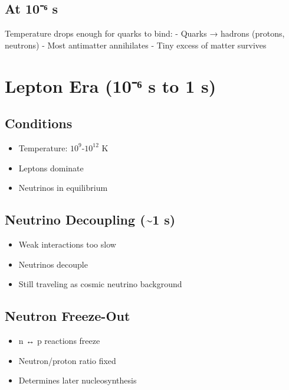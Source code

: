 \documentclass[
  11pt,
  letterpaper,
  twoside,
  openright]{book}
\providecommand{\tightlist}{%
  \setlength{\itemsep}{0pt}\setlength{\parskip}{0pt}}
\begin{document}
\subsection{At 10⁻⁶ s}\label{at-10ux2076-s}

Temperature drops enough for quarks to bind: - Quarks → hadrons
(protons, neutrons) - Most antimatter annihilates - Tiny excess of
matter survives

\section{Lepton Era (10⁻⁶ s to 1 s)}\label{lepton-era-10ux2076-s-to-1-s}

\subsection{Conditions}\label{conditions-3}

\begin{itemize}
\tightlist
\item
  Temperature: \(10^9\)-\(10^{12}\) K
\item
  Leptons dominate
\item
  Neutrinos in equilibrium
\end{itemize}

\subsection{Neutrino Decoupling (\textasciitilde1
s)}\label{neutrino-decoupling-1-s}

\begin{itemize}
\tightlist
\item
  Weak interactions too slow
\item
  Neutrinos decouple
\item
  Still traveling as cosmic neutrino background
\end{itemize}

\subsection{Neutron Freeze-Out}\label{neutron-freeze-out}

\begin{itemize}
\tightlist
\item
  n ↔ p reactions freeze
\item
  Neutron/proton ratio fixed
\item
  Determines later nucleosynthesis
\end{itemize}
\end{document}
